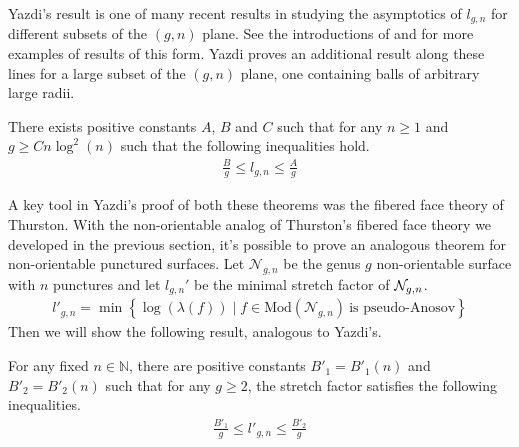 Yazdi's result is one of many recent results in studying the asymptotics of $l_{g,n}$ for different subsets of
the $(g,n)$ plane. See the introductions of \cite{yazdi2018pseudo} and \cite{tsai2009asymptotic} for more
examples of results of this form. Yazdi proves an additional result along these lines for a large subset of
the $(g,n)$ plane, one containing balls of arbitrary large radii.

\begin{thm}[Yazdi]
    \label{thm:yazdi2}
    There exists positive constants $A$, $B$ and $C$ such that for any $n \geq 1$ and $g \geq Cn\log^2(n)$ such that
    the following inequalities hold.
    \begin{align*}
        \frac{B}{g} \leq l_{g,n} \leq \frac{A}{g}
    \end{align*}

\end{thm}
A key tool in Yazdi's proof of both these theorems was the fibered face theory of Thurston. With the non-orientable analog of
Thurston's fibered face theory we developed in the previous section, it's possible to prove an analogous
theorem for non-orientable punctured surfaces.  Let $\mathcal{N}_{g,n}$ be the genus $g$ non-orientable
surface with $n$ punctures and let $l_{g,n}'$ be the minimal stretch factor of $\mathcal{N}_{g,n}$.
\begin{align*}
  l'_{g,n} = \min\left\{\log(\lambda(f)) \mid f \in \text{Mod}(\mathcal{N}_{g,n})\ \text{is pseudo-Anosov}\right\}
\end{align*}
Then we will show the following result, analogous to Yazdi's.
\begin{thm}
  \label{thm:stretch1}
  For any fixed $n \in \mathbb{N}$, there are positive constants $B'_1 = B'_1(n)$ and $B'_2 = B'_2(n)$ such that
  for any $g \geq 2$, the stretch factor satisfies the following inequalities.
  \begin{align*}
    \frac{B'_1}{g} \leq l'_{g,n} \leq \frac{B'_2}{g}
  \end{align*}
\end{thm}


